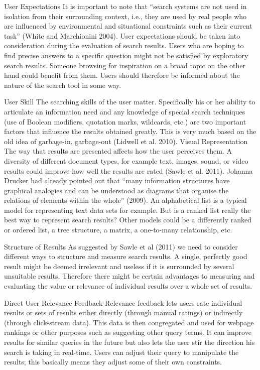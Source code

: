 User Expectations  It is important to note that ``search systems are not used in isolation from their surrounding context, i.e., they are used by real people who are influenced by environmental and situational constraints such as their current task'' (White and Marchionini 2004). User expectations should be taken into consideration during the evaluation of search results. Users who are hoping to find precise answers to a specific question might not be satisfied by exploratory search results. Someone browsing for inspiration on a broad topic on the other hand could benefit from them. Users should therefore be informed about the nature of the search tool in some way.

User Skill   The searching skills of the user matter. Specifically his or her ability to articulate an information need and any knowledge of special search techniques (use of Boolean modifiers, quotation marks, wildcards, etc.) are two important factors that influence the results obtained greatly. This is very much based on the old idea of garbage-in, garbage-out (Lidwell et al. 2010).
Visual Representation   The way that results are presented affects how the user perceives them. A diversity of different document types, for example text, images, sound, or video results could improve how well the results are rated (Sawle et al. 2011). Johanna Drucker had already pointed out that ``many information structures have graphical analogies and can be understood as diagrams that organise the relations of elements within the whole'' (2009). An alphabetical list is a typical model for representing text data sets for example. But is a ranked list really the best way to represent search results? Other models could be a differently ranked or ordered list, a tree structure, a matrix, a one-to-many relationship, etc.

Structure of Results  As suggested by Sawle et al (2011) we need to consider different ways to structure and measure search results. A single, perfectly good result might be deemed irrelevant and useless if it is surrounded by several unsuitable results. Therefore there might be certain advantages to measuring and evaluating the value or relevance of individual results over a whole set of results.

Direct User Relevance Feedback   Relevance feedback lets users rate individual results or sets of results either directly (through manual ratings) or indirectly (through click-stream data). This data is then congregated and used for webpage rankings or other purposes such as suggesting other query terms. It can improve results for similar queries in the future but also lets the user stir the direction his search is taking in real-time. Users can adjust their query to manipulate the results; this basically means they adjust some of their own constraints.

